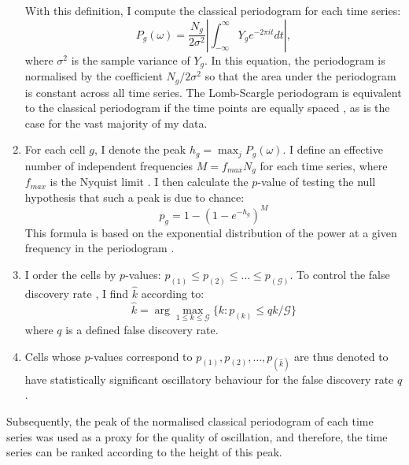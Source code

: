 \begin{enumerate}
With this definition, I compute the classical periodogram for each time series:
  \begin{equation}
    P_{g}(\omega) = \frac{N_{g}}{2\sigma^{2}} \left|\int_{-\infty}^{\infty} Y_{g} e^{-2\pi it}dt \right|, %
    \label{eq:normalised-periodogram-ar}
  \end{equation}
        where $\sigma^{2}$ is the sample variance of $Y_{g}$.
        In this equation, the periodogram is normalised by the coefficient $N_{g}/2\sigma^{2}$ so that the area under the periodogram is constant across all time series.
        The Lomb-Scargle periodogram is equivalent to the classical periodogram if the time points are equally spaced \parencite{lombLeastsquaresFrequencyAnalysis1976}, as is the case for the vast majority of my data.
\item For each cell $g$, I denote the peak $h_{g} = \max_{j}P_{g}(\omega)$.
I define an effective number of independent frequencies $M = f_{max}N_{g}$ for each time series, where $f_{max}$ is the Nyquist limit \parencite{vanderplasUnderstandingLombScarglePeriodogram2018}.
  I then calculate the $p$-value of testing the null hypothesis that such a peak is due to chance:
  \begin{equation}
    p_{g} = 1 - (1 - e^{-h_{g}})^M
    \label{eq:lsp-pval}
  \end{equation}
  This formula is based on the exponential distribution of the power at a given frequency in the periodogram \parencite{scargleStudiesAstronomicalTime1982}.
\item I order the cells by $p$-values: $p_{(1)} \leq p_{(2)} \leq \dots \leq p_{(\mathcal{G})}$.
  To control the false discovery rate \parencite{benjaminiControllingFalseDiscovery1995}, I find $\hat{k}$ according to:
  \begin{equation}
    \hat{k} = \arg\max_{1 \leq k \leq \mathcal{G}}\{k : p_{(k)} \leq qk/\mathcal{G}\}
    \label{eq:lsp-khat}
  \end{equation}
  where $q$ is a defined false discovery rate.
\item Cells whose $p$-values correspond to $p_{(1)}, p_{(2)}, \dots, p_{(\hat{k})}$ are thus denoted to have statistically significant oscillatory behaviour for the false discovery rate $q$.
\end{enumerate}

Subsequently, the peak of the normalised classical periodogram of each time series was used as a proxy for the quality of oscillation, and therefore, the time series can be ranked according to the height of this peak.


